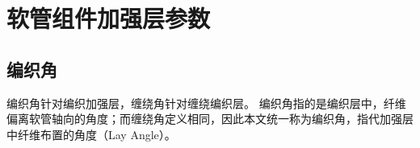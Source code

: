 %		
	





	




\section{软管组件加强层参数}
\label{sec:parameter}
\subsection{编织角}



编织角针对编织加强层，缠绕角针对缠绕编织层。
编织角指的是编织层中，纤维偏离软管轴向的角度；而缠绕角定义相同，因此本文统一称为编织角，指代加强层中纤维布置的角度（Lay Angle）。

